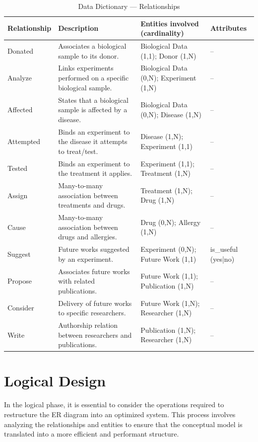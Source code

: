 \documentclass[11pt,a4paper]{article}
\begin{document}
\begin{table}[H]
\centering
\small
\renewcommand{\arraystretch}{1.2}
\begin{tabularx}{\textwidth}{|p{3cm}|X|X|p{2.2cm}|}
\hline
  \textbf{Relationship} & \textbf{Description} & \textbf{Entities involved (cardinality)} & \textbf{Attributes} \\
\hline
Donated & Associates a biological sample to its donor. & Biological Data (1,1); Donor (1,N) & -- \\
\hline
Analyze & Links experiments performed on a specific biological sample. & Biological Data (0,N); Experiment (1,N) & -- \\
\hline
Affected & States that a biological sample is affected by a disease. & Biological Data (0,N); Disease (1,N) & -- \\
\hline
Attempted & Binds an experiment to the disease it attempts to treat/test. & Disease (1,N); Experiment (1,1) & -- \\
\hline
Tested & Binds an experiment to the treatment it applies. & Experiment (1,1); Treatment (1,N) & -- \\
\hline
Assign & Many-to-many association between treatments and drugs. & Treatment (1,N); Drug (1,N) & -- \\
\hline
Cause & Many-to-many association between drugs and allergies. & Drug (0,N); Allergy (1,N) & -- \\
\hline
Suggest & Future works suggested by an experiment. & Experiment (0,N); Future Work (1,1) & is\_useful\,(yes|no) \\
\hline
Propose & Associates future works with related publications. & Future Work (1,1); Publication (1,N) & -- \\
\hline
Consider & Delivery of future works to specific researchers. & Future Work (1,N); Researcher (1,N) & -- \\
\hline
Write & Authorship relation between researchers and publications. & Publication (1,N); Researcher (1,N) & -- \\
\hline
\end{tabularx}
\caption{Data Dictionary — Relationships}
\normalsize
\end{table}



\section{Logical Design}

In the logical phase, it is essential to consider the operations required to restructure the ER diagram into an optimized system.  
This process involves analyzing the relationships and entities to ensure that the conceptual model is translated into a more efficient and performant structure.  
\end{document}
